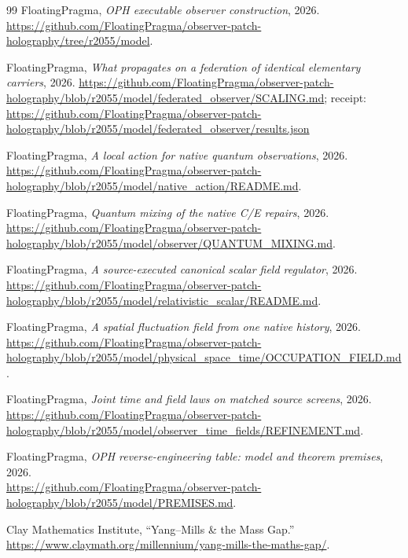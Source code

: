 \documentclass[11pt]{article}
\numberwithin{equation}{section}
\theoremstyle{remark}
\begin{document}
\begin{thebibliography}{99}
FloatingPragma,
\emph{OPH executable observer construction}, 2026.\\
\url{https://github.com/FloatingPragma/observer-patch-holography/tree/r2055/model}.

FloatingPragma,
\emph{What propagates on a federation of identical elementary carriers}, 2026.
\url{https://github.com/FloatingPragma/observer-patch-holography/blob/r2055/model/federated_observer/SCALING.md};
receipt: \url{https://github.com/FloatingPragma/observer-patch-holography/blob/r2055/model/federated_observer/results.json}

FloatingPragma,
\emph{A local action for native quantum observations}, 2026.\\
\url{https://github.com/FloatingPragma/observer-patch-holography/blob/r2055/model/native_action/README.md}.

FloatingPragma,
\emph{Quantum mixing of the native C/E repairs}, 2026.\\
\url{https://github.com/FloatingPragma/observer-patch-holography/blob/r2055/model/observer/QUANTUM_MIXING.md}.

FloatingPragma,
\emph{A source-executed canonical scalar field regulator}, 2026.\\
\url{https://github.com/FloatingPragma/observer-patch-holography/blob/r2055/model/relativistic_scalar/README.md}.

FloatingPragma,
\emph{A spatial fluctuation field from one native history}, 2026.\\
\url{https://github.com/FloatingPragma/observer-patch-holography/blob/r2055/model/physical_space_time/OCCUPATION_FIELD.md}.

FloatingPragma,
\emph{Joint time and field laws on matched source screens}, 2026.\\
\url{https://github.com/FloatingPragma/observer-patch-holography/blob/r2055/model/observer_time_fields/REFINEMENT.md}.

FloatingPragma,
\emph{OPH reverse-engineering table: model and theorem premises}, 2026.\\
\url{https://github.com/FloatingPragma/observer-patch-holography/blob/r2055/model/PREMISES.md}.

Clay Mathematics Institute,
``Yang--Mills \& the Mass Gap.''\\
\url{https://www.claymath.org/millennium/yang-mills-the-maths-gap/}.


\end{thebibliography}
\end{document}
